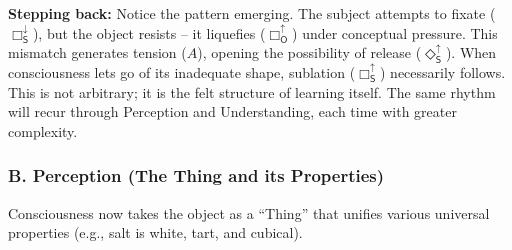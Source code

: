 \documentclass[12pt]{book}
\begin{document}
\textbf{Stepping back:} Notice the pattern emerging. The subject attempts to fixate ($\Box_{\mathsf{S}}^{\downarrow}$), but the object resists -- it liquefies ($\Box_{\mathsf{O}}^{\uparrow}$) under conceptual pressure. This mismatch generates tension ($A$), opening the possibility of release ($\Diamond_{\mathsf{S}}^{\uparrow}$). When consciousness lets go of its inadequate shape, sublation ($\Box_{\mathsf{S}}^{\uparrow}$) necessarily follows. This is not arbitrary; it is the felt structure of learning itself. The same rhythm will recur through Perception and Understanding, each time with greater complexity.

\subsubsection{B. Perception (The Thing and its Properties)}

Consciousness now takes the object as a ``Thing'' that unifies various universal properties (e.g., salt is white, tart, and cubical).
\end{document}
